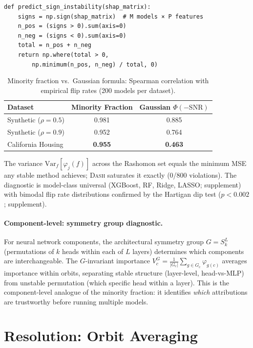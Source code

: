 \documentclass{article}
\newcommand{\Var}{\mathrm{Var}}
\newcommand{\DASH}{\textsc{Dash}}
\begin{document}
{\small
\begin{verbatim}
def predict_sign_instability(shap_matrix):
    signs = np.sign(shap_matrix)  # M models × P features
    n_pos = (signs > 0).sum(axis=0)
    n_neg = (signs < 0).sum(axis=0)
    total = n_pos + n_neg
    return np.where(total > 0,
        np.minimum(n_pos, n_neg) / total, 0)
\end{verbatim}
}

\begin{table}[t]
\centering
\caption{Minority fraction vs.\ Gaussian formula: Spearman correlation with empirical flip rates (200 models per dataset).}
\label{tab:cc-comparison}
\small
\begin{tabular}{@{}lcc@{}}
\toprule
Dataset & Minority Fraction & Gaussian $\Phi(-\text{SNR})$ \\
\midrule
Synthetic ($\rho = 0.5$) & 0.981 & 0.885 \\
Synthetic ($\rho = 0.9$) & 0.952 & 0.764 \\
California Housing & \textbf{0.955} & \textbf{0.463} \\
\bottomrule
\end{tabular}
\end{table}

The variance $\Var_f[\varphi_j(f)]$ across the Rashomon set equals the minimum MSE any stable method achieves; \DASH{} saturates it exactly (0/800 violations). The diagnostic is model-class universal (XGBoost, RF, Ridge, LASSO; supplement) with bimodal flip rate distributions confirmed by the Hartigan dip test ($p < 0.002$; supplement).

\paragraph{Component-level: symmetry group diagnostic.}
For neural network components, the architectural symmetry group $G = S_k^L$ (permutations of $k$ heads within each of $L$ layers) determines which components are interchangeable. The $G$-invariant importance $V^G_c = \frac{1}{|G_c|}\sum_{g \in G_c} \varphi_{g(c)}$ averages importance within orbits, separating stable structure (layer-level, head-vs-MLP) from unstable permutation (which specific head within a layer). This is the component-level analogue of the minority fraction: it identifies \emph{which} attributions are trustworthy before running multiple models.

\section{Resolution: Orbit Averaging}
\label{sec:resolution}
\end{document}
